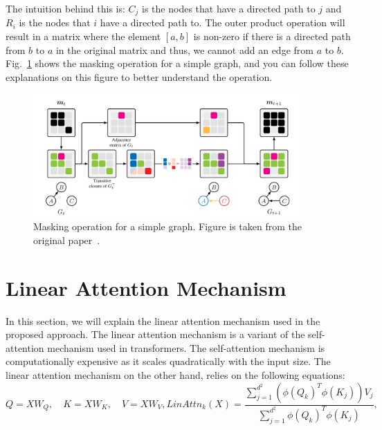 \documentclass{lxaiproposal}
\begin{document}
    The intuition behind this is: $C_j$ is the nodes that have a directed path to $j$ and $R_i$ is the nodes that
    $i$ have a directed path to. The outer product operation will result in a matrix where the element $[a, b]$ is
    non-zero if there is a directed path from $b$ to $a$ in the original matrix and thus, we cannot add an edge from
    $a$ to $b$. Fig.~\ref{fig:masking} shows the masking operation for a simple graph, and you can follow these
    explanations on this figure to better understand the operation.

    \begin{figure}[h]
        \centering
        \includegraphics[width=0.92\textwidth]{figures/masking}
        \caption{Masking operation for a simple graph. Figure is taken from the original paper~\cite{deleu2022daggflownet}.}
        \label{fig:masking}
    \end{figure}


    \section{Linear Attention Mechanism}\label{app:linear_attention}
    \vspace*{-3mm}

    In this section, we will explain the linear attention mechanism used in the proposed approach. The linear attention
    mechanism is a variant of the self-attention mechanism used in transformers. The self-attention mechanism is
    computationally expensive as it scales quadratically with the input size. The linear attention mechanism on the
    other hand, relies on the following equations:
    \begin{equation}
        Q = XW_Q, \quad K = XW_K, \quad V = XW_V, LinAttn_k(X) = \frac{\sum_{j=1}^{d^2}
            \left(\phi(Q_k)^T\phi(K_j)\right)V_j}{\sum_{j=1}^{d^2} \phi(Q_k)^T\phi(K_j)},
        \label{eq:linear_attention}
    \end{equation}
\end{document}
